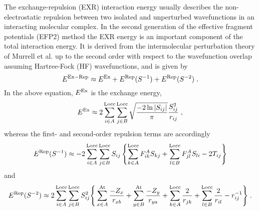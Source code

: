 \documentclass[aip,jcp,amsmath,amssymb,preprint,floatfix]{revtex4-1}
\begin{document}
The exchange\hyp{}repulsion (EXR) interaction energy 
usually describes the non\hyp{}electrostatic repulsion
between two isolated and unperturbed 
wavefunctions in an interacting
molecular 
complex.\cite{Murrell.Randic.Williams.Longuet-Higgins.ProcRSocLondA.1965,Otto.Ladik.ChemPhys.1975,Hayes.Stone.MolPhys.1984,Jeziorski.Moszynski.Szalewicz.ChemRev.1994,Jensen.Gordon.MolPhys.1996,Hesselmann.Jansen.Schutz.JCP.2005,Mandado.Hermida-Ramon.JCTC.2011}
In the
second generation of the
effective fragment potentials (EFP2) method\cite{Gordon.Smith.Xu.Slipchenko.AnnuRevPhysChem.2013,
   Nguyen.Pachter.Day.JCP.2014,
   Day.Jensen.Gordon.Webb.Stevens.Krauss.Garmer.Basch.Cohen.JCP.1996}
the EXR energy is an important component of the total interaction energy.
It is
derived from the intermolecular perturbation theory
of Murrell et al.\cite{Murrell.Randic.Williams.Longuet-Higgins.ProcRSocLondA.1965,Otto.Ladik.ChemPhys.1975} 
up to the second order with respect to the wavefunction overlap
assuming Hartree\hyp{}Fock\cite{Roothaan.RevModPhys.1951} (HF) wavefunctions,
and is given by~\cite{Jensen.JCP.1996,Jensen.Gordon.MolPhys.1996,Jensen.Gordon.JCP.1998}
%
\begin{equation} \label{e:exr-efp2}
 E^{\rm Ex-Rep} \approx
 E^{\rm Ex} +
 E^{\rm Rep}(S^{-1}) + 
 E^{\rm Rep}(S^{-2}) \;.
\end{equation}
%
In the above equation,
$E^{\rm Ex}$ is the exchange energy,\cite{Jensen.JCP.1996}
%
\begin{equation} \label{e:exc-efp2}
 E^{\rm Ex} \approx 2 \sum_{i\in A}^{\rm Locc} \sum_{j\in B}^{\rm Locc} 
 \sqrt{\frac{-2\ln{\vert S_{ij}\vert}}{\pi}} \frac{S^2_{ij}}{r_{ij}} \;,
\end{equation}
%
whereas the first\hyp{} and second\hyp{}order repulsion terms
are accordingly~\cite{Jensen.Gordon.MolPhys.1996,Jensen.Gordon.JCP.1998}
%
\begin{equation} \label{e:rep-efp2.s1}
 E^{\rm Rep}(S^{-1}) \approx - 2 \sum_{i\in A}^{\rm Locc} \sum_{j\in B}^{\rm Locc} S_{ij} 
 \left\{
 \sum_{k\in A}^{\rm Locc} F_{ik}^A S_{kj} 
+\sum_{l\in B}^{\rm Locc} F_{jl}^A S_{li} 
 -2T_{ij}
 \right\}
\end{equation}
%
and 
%
\begin{equation} \label{e:rep-efp2.s2}
 E^{\rm Rep}(S^{-2}) \approx 2 \sum_{i\in A}^{\rm Locc} \sum_{j\in B}^{\rm Locc} S_{ij}^2 
 \Bigg\{
 \sum_{x\in A}^{\rm At}  \frac{-Z_x}{r_{xb}}
+\sum_{y\in B}^{\rm At}  \frac{-Z_y}{r_{ya}} 
+\sum_{k\in A}^{\rm Locc} \frac{   2}{r_{jk}}
+\sum_{l\in B}^{\rm Locc} \frac{   2}{r_{il}}
-r_{ij}^{-1}
 \Bigg\} \;.
\end{equation}
\end{document}
